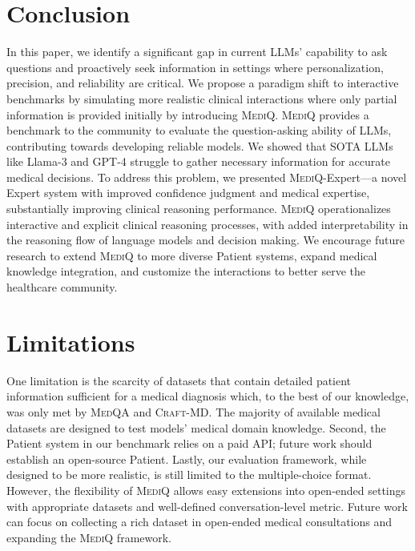 \documentclass{article}
\begin{document}
\section{Conclusion}\label{sec:conclusion}\vspace{-0.5mm}
In this paper, we identify a significant gap in current LLMs' capability to ask questions and proactively seek information in settings where personalization, precision, and reliability are critical. 
We propose a paradigm shift to interactive benchmarks by simulating more realistic clinical interactions where only partial information is provided initially by introducing \textsc{MediQ}. 
\textsc{MediQ} provides a benchmark to the community to evaluate the question-asking ability of LLMs, contributing towards developing reliable models.
We showed that SOTA LLMs like Llama-3 and GPT-4 struggle to gather necessary information for accurate medical decisions. To address this problem, we presented \textsc{MediQ}-Expert---a novel Expert system with improved confidence judgment and medical expertise, substantially improving clinical reasoning performance. 
\textsc{MediQ} operationalizes interactive and explicit clinical reasoning processes, with added interpretability in the reasoning flow of language models and decision making.
We encourage future research to extend \textsc{MediQ} to more diverse Patient systems, expand medical knowledge integration, and customize the interactions to better serve the healthcare community.%

\section*{Limitations}%
One limitation is the scarcity of datasets that contain detailed patient information sufficient for a medical diagnosis which, to the best of our knowledge, was only met by \textsc{MedQA} and \textsc{Craft-MD}. 
The majority of available medical datasets are designed to test models' medical domain knowledge. %
Second, the Patient system in our benchmark relies on a paid API; future work should establish an open-source Patient.
Lastly, our evaluation framework, while designed to be more realistic, is still limited to the multiple-choice format. However, the flexibility of \textsc{MediQ} allows easy extensions into open-ended settings with appropriate datasets and well-defined conversation-level metric. Future work can focus on collecting a rich dataset in open-ended medical consultations and expanding the \textsc{MediQ} framework.
\end{document}
